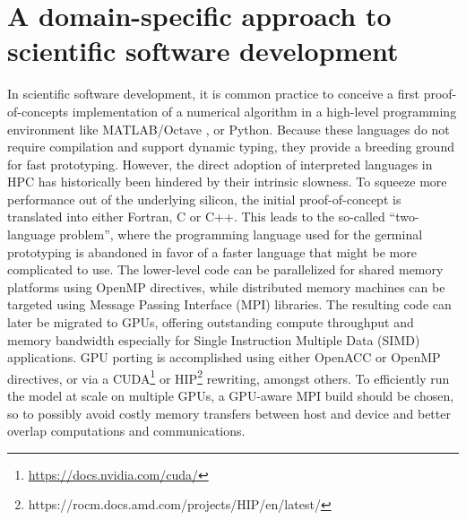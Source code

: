 \documentclass[main.tex]{subfiles}
\begin{document}
    \justifying

    \section{A domain-specific approach to scientific software development}
    \label{section:domain-specific-approach-to-scientific-software-development}

        In scientific software development, it is common practice to conceive a first proof-of-concepts implementation of a numerical algorithm in a high-level programming environment like MATLAB/Octave \citep{lindfield18}, or Python. Because these languages do not require compilation and support dynamic typing, they provide a breeding ground for fast prototyping. However, the direct adoption of interpreted languages in HPC has historically been hindered by their intrinsic slowness. To squeeze more performance out of the underlying silicon, the initial proof-of-concept is translated into either Fortran, C or C++. This leads to the so-called ``two-language problem'', where the programming language used for the germinal prototyping is abandoned in favor of a faster language that might be more complicated to use. The lower-level code can be parallelized for shared memory platforms using OpenMP directives, while distributed memory machines can be targeted using Message Passing Interface (MPI) libraries. %
        The resulting code can later be migrated to GPUs, offering outstanding compute throughput and memory bandwidth especially for Single Instruction Multiple Data (SIMD) applications. GPU porting is accomplished using either OpenACC or OpenMP directives, or via a CUDA\footnote{\url{https://docs.nvidia.com/cuda/}} or HIP\footnote{{https://rocm.docs.amd.com/projects/HIP/en/latest/}} rewriting, amongst others. To efficiently run the model at scale on multiple GPUs, a GPU-aware MPI build should be chosen, so to possibly avoid costly memory transfers between host and device and better overlap computations and communications.
\end{document}

